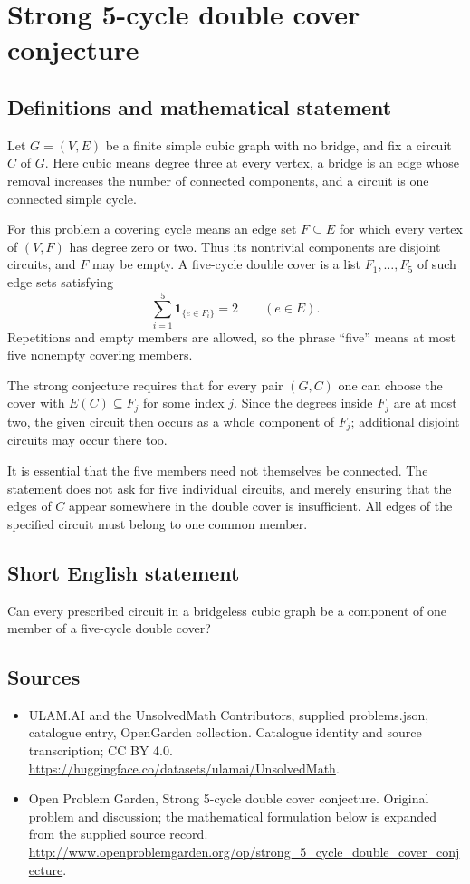 \documentclass[11pt,a4paper]{article}
\begin{document}
\section*{Strong 5-cycle double cover conjecture}\label{statement}

\subsection{Definitions and mathematical statement}
Let $G=(V,E)$ be a finite simple cubic graph with no bridge,
and fix a circuit $C$ of $G$. Here cubic means degree three
at every vertex, a bridge is an edge whose removal increases
the number of connected components, and a circuit is one
connected simple cycle.

For this problem a covering cycle means an edge set
$F\subseteq E$ for which every vertex of $(V,F)$ has degree
zero or two. Thus its nontrivial components are disjoint
circuits, and $F$ may be empty. A five-cycle double cover
is a list $F_1,\ldots,F_5$ of such edge sets satisfying
\[
 \sum_{i=1}^5\mathbf1_{\{e\in F_i\}}=2
 \qquad(e\in E).
\]
Repetitions and empty members are allowed, so the phrase
``five'' means at most five nonempty covering members.

The strong conjecture requires that for every pair $(G,C)$
one can choose the cover with $E(C)\subseteq F_j$ for some
index $j$. Since the degrees inside $F_j$ are at most two,
the given circuit then occurs as a whole component of
$F_j$; additional disjoint circuits may occur there too.

It is essential that the five members need not themselves
be connected. The statement does not ask for five individual
circuits, and merely ensuring that the edges of $C$ appear
somewhere in the double cover is insufficient. All edges
of the specified circuit must belong to one common member.
\subsection{Short English statement}
Can every prescribed circuit in a bridgeless cubic graph be a component of one member of a five-cycle double cover?
\subsection{Sources}
\begin{itemize}
\item[S1] ULAM.AI and the UnsolvedMath Contributors, supplied problems.json, catalogue entry, OpenGarden collection. Catalogue identity and source transcription; CC BY 4.0.
\url{https://huggingface.co/datasets/ulamai/UnsolvedMath}.
\item[S2] Open Problem Garden, Strong 5-cycle double cover conjecture. Original problem and discussion; the mathematical formulation below is expanded from the supplied source record.
\url{http://www.openproblemgarden.org/op/strong_5_cycle_double_cover_conjecture}.
\end{itemize}
\end{document}
